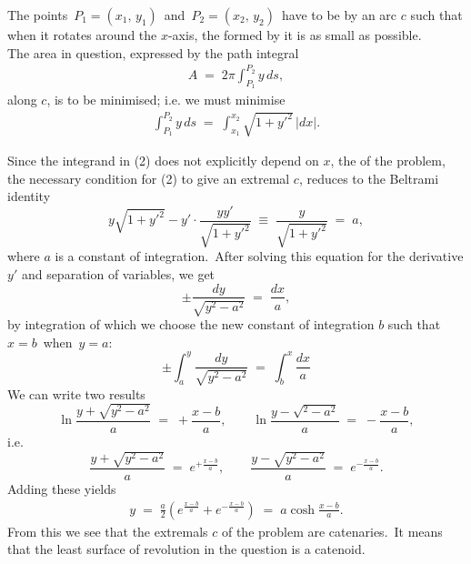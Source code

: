 \documentclass[12pt]{article}
\theoremstyle{definition}
\begin{document}
The points \,$P_1 = (x_1,\,y_1)$\, and\, $P_2 = (x_2,\,y_2)$\, have to be  by an arc $c$ such that when it rotates around the $x$-axis, the  formed by it is as small as possible. \\

The area in question, expressed by the path integral
\begin{align}
A \;=\; 2\pi\int_{P_1}^{P_2}\!y\,ds,
\end{align}
along $c$, is to be minimised; i.e. we must minimise
\begin{align}
\int_{P_1}^{P_2}\!y\,ds \;=\; \int_{x_1}^{x_2}\sqrt{1\!+\!y'^2}\,|dx|.
\end{align}


Since the integrand in (2) does not explicitly depend on $x$, the  of the problem, the necessary condition for (2) to give an extremal $c$, reduces to the Beltrami identity
$$y\sqrt{1\!+\!y'^2}-y'\!\!\cdot\!\frac{yy'}{\sqrt{1\!+\!y'^2}} 
\;\equiv\; \frac{y}{\sqrt{1\!+\!y'^2}} \;=\; a,$$
where $a$ is a constant of integration.\, After solving this equation for the derivative $y'$ and separation of variables, we get
$$\pm\frac{dy}{\sqrt{y^2\!-\!a^2}} \;=\; \frac{dx}{a},$$
by integration of which
we choose the new constant of integration $b$ such that\, $x = b$\, when\, $y = a$:
$$\pm\int_a^y\frac{dy}{\sqrt{y^2\!-\!a^2}} \;=\; \int_b^x\frac{dx}{a}$$
We can write two  results
$$\ln\frac{y\!+\!\sqrt{y^2\!-\!a^2}}{a} \;=\; +\frac{x\!-\!b}{a}, \qquad 
  \ln\frac{y\!-\!\sqrt{^2\!-\!a^2}}{a} \;=\; -\frac{x\!-\!b}{a},$$
i.e.
$$\frac{y\!+\!\sqrt{y^2\!-\!a^2}}{a} \;=\; e^{+\frac{x-b}{a}}, \qquad 
  \frac{y\!-\!\sqrt{y^2\!-\!a^2}}{a} \;=\; e^{-\frac{x-b}{a}}.$$
Adding these yields
\begin{align}
y \;=\; \frac{a}{2}\!\left(e^{\frac{x-b}{a}}+e^{-\frac{x-b}{a}}\right) \;=\; a\cosh\frac{x\!-\!b}{a}.
\end{align}
From this we see that the extremals $c$ of the problem are catenaries.\, It means that the least surface of revolution in the question is a catenoid.


\end{document}
